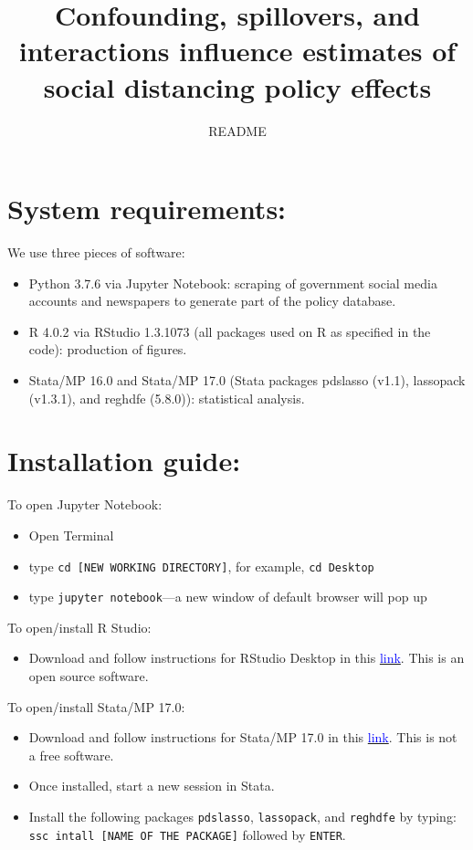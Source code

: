 \documentclass{article}
\title{Confounding, spillovers, and interactions
influence estimates of social distancing policy effects}
\date{\vspace{-10mm} README}
\begin{document}
\maketitle

\bigskip 


\section{System requirements:}

We use three pieces of software:

\begin{itemize}
\item Python 3.7.6 via Jupyter Notebook: scraping of government social media accounts and newspapers to generate part of the policy database. 
\item R  4.0.2 via RStudio 1.3.1073 (all packages used on R as specified in the code): production of figures.
\item Stata/MP 16.0 and Stata/MP 17.0 (Stata packages pdslasso (v1.1), lassopack (v1.3.1), and reghdfe (5.8.0)): statistical analysis.
\end{itemize}

\section{Installation guide:}

To open Jupyter Notebook:
\begin{itemize}
\item Open Terminal
\item type \texttt{cd [NEW WORKING DIRECTORY]}, for example, \texttt{cd Desktop}
\item type \texttt{jupyter notebook}---a new window of default browser will pop up
\end{itemize}

\noindent To open/install R Studio:
\begin{itemize}
\item Download and follow instructions for RStudio Desktop in this \href{https://www.rstudio.com/products/rstudio/}{\textcolor{blue}{link}}. This is an open source software.
\end{itemize}

\noindent To open/install Stata/MP 17.0:
\begin{itemize}
\item Download and follow instructions for Stata/MP 17.0 in this \href{https://www.stata.com/statamp/}{\textcolor{blue}{link}}. This is not a free software.
\item Once installed, start a new session in Stata.
\item Install the following packages \texttt{pdslasso}, \texttt{lassopack}, and \texttt{reghdfe} by typing: \texttt{ssc intall [NAME OF THE PACKAGE]} followed by \texttt{ENTER}.
\end{itemize}
\end{document}
